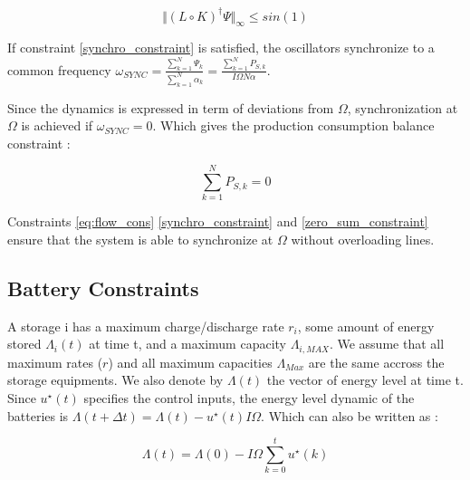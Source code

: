 \documentclass[conference]{IEEEtran}
\begin{document}

\begin{equation}
\label{synchro_constraint}
\Vert \left( L \circ K \right)^{\dagger} \Psi \Vert_{\infty} \leq sin(1)
\end{equation}

If constraint \ref{synchro_constraint} is satisfied, the oscillators synchronize to a common frequency $ \omega_{SYNC} = \frac{\sum_{k=1}^{N}\Psi_k}{\sum_{k=1}^{N}\alpha_k} = \frac{\sum_{k=1}^{N}P_{S,k}}{I\Omega N \alpha}$. 

Since the dynamics is expressed in term of deviations from $ \Omega$, synchronization at $ \Omega $ is achieved if $\omega_{SYNC} = 0 $. Which gives the production consumption balance constraint :

\begin{equation}
\label{zero_sum_constraint}
\sum_{k=1}^{N} P_{S,k} = 0
\end{equation}

Constraints \ref{eq:flow_cons} \ref{synchro_constraint} and \ref{zero_sum_constraint} ensure that the system is able to synchronize at $\Omega$ without overloading lines.


\subsection{Battery Constraints}

A storage i has a maximum charge/discharge rate $r_i$, some amount of energy stored $ \Lambda_i(t) $ at time t, and a maximum capacity $ \Lambda_{i, MAX} $. We assume that all maximum rates ($r$) and all maximum capacities $\Lambda_{Max}$ are the same accross the storage equipments. We also denote by $ \Lambda(t) $ the vector of energy level at time t. Since $ u^{\star}(t) $ specifies the control inputs, the energy level dynamic of the batteries is $ \Lambda(t+\Delta t) = \Lambda(t) - u^{\star}(t) I \Omega $. Which can also be written as :

\begin{equation}
\Lambda(t)  = \Lambda(0) - I \Omega \sum_{k=0}^{t}u^{\star}(k)
\end{equation}
\end{document}
